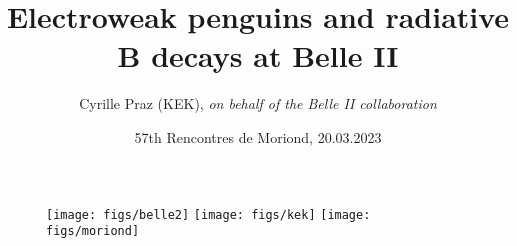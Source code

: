 \title[Electroweak penguins and radiative $B$ decays]{Electroweak penguins and radiative $\boldsymbol{B}$ decays at Belle II}
\author[Cyrille Praz (KEK)]{Cyrille Praz (KEK), \emph{on behalf of the Belle II collaboration}}
\date[20.03.2023]{57th Rencontres de Moriond, 20.03.2023}
{
\begin{frame}
\vspace{0.25cm}
\begin{figure}
\begin{center}
\texttt{[image: figs/belle2]}
\hspace{0.1cm}
\texttt{[image: figs/kek]}
\hspace{0.1cm}
\texttt{[image: figs/moriond]}
\end{center}
\end{figure}
\vspace{-1.2cm}
\titlepage
\end{frame}
}
